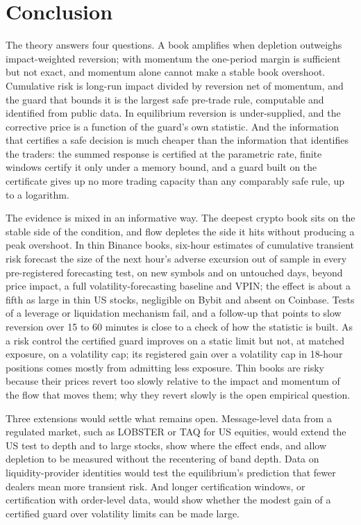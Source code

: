 \section{Conclusion}\label{sec:conclusion}

The theory answers four questions. A book amplifies when depletion outweighs impact-weighted reversion; with momentum the one-period margin is sufficient but not exact, and momentum alone cannot make a stable book overshoot. Cumulative risk is long-run impact divided by reversion net of momentum, and the guard that bounds it is the largest safe pre-trade rule, computable and identified from public data. In equilibrium reversion is under-supplied, and the corrective price is a function of the guard's own statistic. And the information that certifies a safe decision is much cheaper than the information that identifies the traders: the summed response is certified at the parametric rate, finite windows certify it only under a memory bound, and a guard built on the certificate gives up no more trading capacity than any comparably safe rule, up to a logarithm.

The evidence is mixed in an informative way. The deepest crypto book sits on the stable side of the condition, and flow depletes the side it hits without producing a peak overshoot. In thin Binance books, six-hour estimates of cumulative transient risk forecast the size of the next hour's adverse excursion out of sample in every pre-registered forecasting test, on new symbols and on untouched days, beyond price impact, a full volatility-forecasting baseline and VPIN; the effect is about a fifth as large in thin US stocks, negligible on Bybit and absent on Coinbase. Tests of a leverage or liquidation mechanism fail, and a follow-up that points to slow reversion over 15 to 60 minutes is close to a check of how the statistic is built. As a risk control the certified guard improves on a static limit but not, at matched exposure, on a volatility cap; its registered gain over a volatility cap in 18-hour positions comes mostly from admitting less exposure. Thin books are risky because their prices revert too slowly relative to the impact and momentum of the flow that moves them; why they revert slowly is the open empirical question.

Three extensions would settle what remains open. Message-level data from a regulated market, such as LOBSTER or TAQ for US equities, would extend the US test to depth and to large stocks, show where the effect ends, and allow depletion to be measured without the recentering of band depth. Data on liquidity-provider identities would test the equilibrium's prediction that fewer dealers mean more transient risk. And longer certification windows, or certification with order-level data, would show whether the modest gain of a certified guard over volatility limits can be made large.

